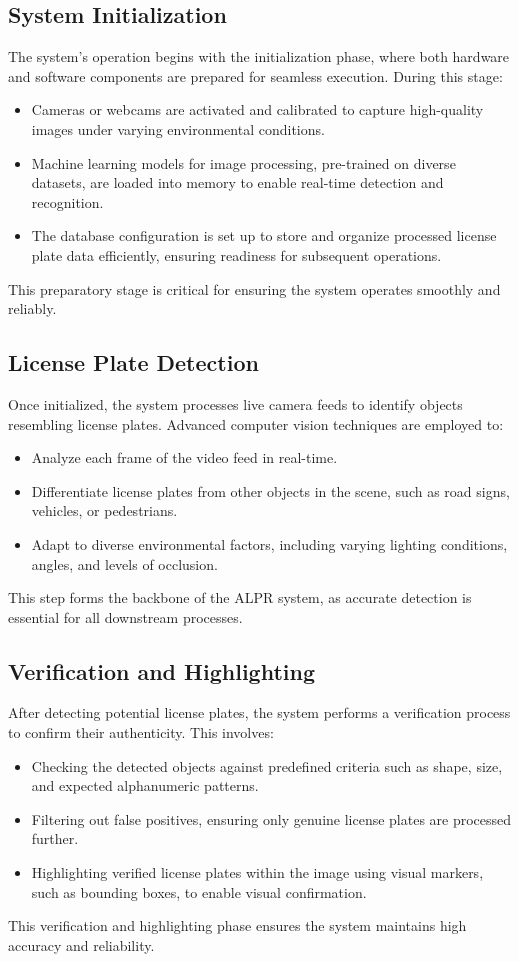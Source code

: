 \subsection{System Initialization}

The system's operation begins with the initialization phase, where both hardware and software components are prepared for seamless execution. During this stage:
\begin{itemize}
	\item Cameras or webcams are activated and calibrated to capture high-quality images under varying environmental conditions.
	\item Machine learning models for image processing, pre-trained on diverse datasets, are loaded into memory to enable real-time detection and recognition.
	\item The database configuration is set up to store and organize processed license plate data efficiently, ensuring readiness for subsequent operations.
\end{itemize}
This preparatory stage is critical for ensuring the system operates smoothly and reliably.

\subsection{License Plate Detection}

Once initialized, the system processes live camera feeds to identify objects resembling license plates. Advanced computer vision techniques are employed to:
\begin{itemize}
	\item Analyze each frame of the video feed in real-time.
	\item Differentiate license plates from other objects in the scene, such as road signs, vehicles, or pedestrians.
	\item Adapt to diverse environmental factors, including varying lighting conditions, angles, and levels of occlusion.
\end{itemize}
This step forms the backbone of the ALPR system, as accurate detection is essential for all downstream processes.

\subsection{Verification and Highlighting}

After detecting potential license plates, the system performs a verification process to confirm their authenticity. This involves:
\begin{itemize}
	\item Checking the detected objects against predefined criteria such as shape, size, and expected alphanumeric patterns.
	\item Filtering out false positives, ensuring only genuine license plates are processed further.
	\item Highlighting verified license plates within the image using visual markers, such as bounding boxes, to enable visual confirmation.
\end{itemize}
This verification and highlighting phase ensures the system maintains high accuracy and reliability.

